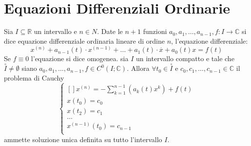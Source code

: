 \section{Equazioni Differenziali Ordinarie}
Sia $I\subseteq\mathbb{R}$ un intervallo e $n\in N$. Date le $n+1$ funzioni $a_0,a_1,\ldots,a_{n-1}, f:I\to\mathbb{C}$ si dice equazione differenziale ordinaria lineare di ordine $n$, l'equazione differenziale:
$$x^{(n)}+a_{n-1}(t)\cdot x^{(n-1)}+\ldots+a_1(t)\cdot\overset{\cdot}{x}+a_0(t)x=f(t)$$
Se $f\equiv 0 $ l'equazione si dice omogenea.
\proposition
sia $I$ un intervallo compatto e tale che $\overset{\circ}{I}\ne \emptyset$ siano $a_0,a_1,\ldots,a_{n-1},f\in C^0(I;\mathbb{C})$. Allora $\forall t_0\in\overset{\circ}{I}$ e $c_0,c_1,\ldots,c_{n-1}\in\mathbb{C}$ il problema di Cauchy 
$$ \left\{\begin{matrix}[]
x^{(n)}=-\sum\limits_{k=1}^{n-1}\left(a_k(t)x^k\right)+f(t)\\
x(t_0)=c_0\\
x(t_2)=c_1\\
\ldots\\
x^{(n-1)}(t_0)=c_{n-1}\\
\end{matrix}\right.$$
ammette soluzione unica definita su tutto l'intervallo $I$.
